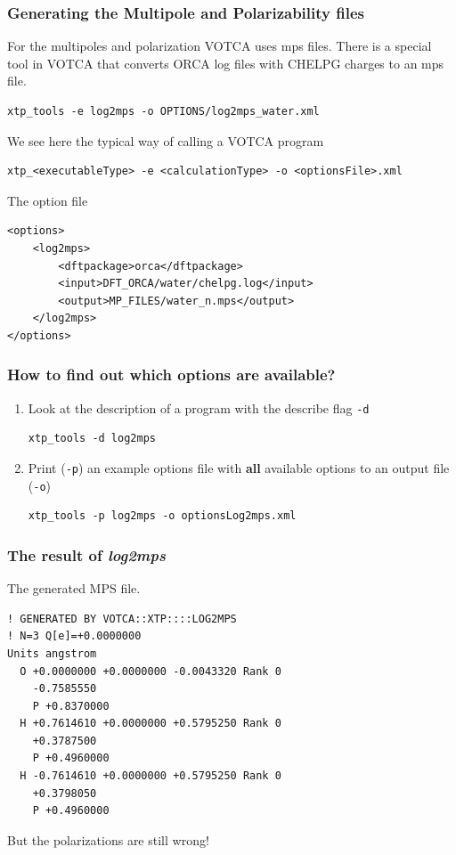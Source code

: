 \documentclass[t,aspectratio=169, 8pt]{beamer}
\begin{document}
\begin{frame}[fragile]
  \frametitle{Generating the Multipole and Polarizability files}
  For the multipoles and polarization VOTCA uses mps files. There is a special tool in VOTCA that converts ORCA log files with CHELPG charges to an mps file.  
  \begin{verbatim}
xtp_tools -e log2mps -o OPTIONS/log2mps_water.xml
  \end{verbatim}
  We see here the typical way of calling a VOTCA program
  \begin{verbatim}
xtp_<executableType> -e <calculationType> -o <optionsFile>.xml
  \end{verbatim}
  The option file
  \begin{verbatim}
<options>
    <log2mps>
        <dftpackage>orca</dftpackage>
        <input>DFT_ORCA/water/chelpg.log</input>
        <output>MP_FILES/water_n.mps</output>
    </log2mps>
</options>
  \end{verbatim}
\end{frame}

\begin{frame}[fragile]
  \frametitle{How to find out which options are available?}
  \begin{enumerate}
    \item Look at the description of a program with the describe flag \texttt{-d}\\
      \begin{verbatim}
xtp_tools -d log2mps
    \end{verbatim}
    \item Print (\texttt{-p}) an example options file with \textbf{all} available options to an output file (\texttt{-o})
    \begin{verbatim}
xtp_tools -p log2mps -o optionsLog2mps.xml
    \end{verbatim}
  \end{enumerate}
\end{frame}


\begin{frame}[fragile]
  \frametitle{The result of \textit{log2mps}}  
  The generated MPS file.
  \begin{verbatim}
! GENERATED BY VOTCA::XTP::::LOG2MPS 
! N=3 Q[e]=+0.0000000
Units angstrom
  O +0.0000000 +0.0000000 -0.0043320 Rank 0
    -0.7585550
    P +0.8370000
  H +0.7614610 +0.0000000 +0.5795250 Rank 0
    +0.3787500
    P +0.4960000
  H -0.7614610 +0.0000000 +0.5795250 Rank 0
    +0.3798050
    P +0.4960000
  \end{verbatim}
  But the polarizations are still wrong!
\end{frame}
\end{document}
